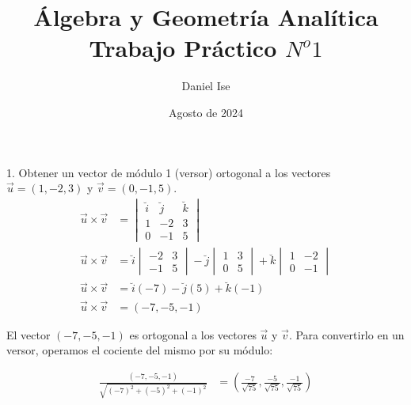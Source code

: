 \documentclass{article}
\title{Álgebra y Geometría Analítica\\ Trabajo Práctico $N^o1$}
\author{Daniel Ise}
\date{Agosto de 2024}
\begin{document}
\maketitle

1. Obtener un vector de módulo 1 (versor) ortogonal a los vectores
$\vec{u} = (1, -2, 3)$ y $\vec{v} = (0, -1, 5)$.
\begin{align*}
    \vec{u}\times\vec{v} & = \begin{vmatrix}
                                 \breve{i} & \breve{j} & \breve{k} \\
                                 1         & -2        & 3         \\
                                 0         & -1        & 5
                             \end{vmatrix}                                         \\
    \vec{u}\times\vec{v} & = \breve{i}\begin{vmatrix}
                                          -2 & 3 \\
                                          -1 & 5
                                      \end{vmatrix} - \breve{j}\begin{vmatrix}
                                                                   1 & 3 \\
                                                                   0 & 5
                                                               \end{vmatrix} + \breve{k}\begin{vmatrix}
                                                                                            1 & -2 \\
                                                                                            0 & -1
                                                                                        \end{vmatrix} \\
    \vec{u}\times\vec{v} & = \breve{i}(-7) - \breve{j}(5) + \breve{k}(-1)                              \\
    \vec{u}\times\vec{v} & = (-7, -5, -1)
\end{align*}

El vector $(-7, -5, -1)$ es ortogonal a los vectores $\vec{u}$ y $\vec{v}$. Para
convertirlo en un versor, operamos el cociente del mismo por su módulo:

\begin{align*}
    \frac{(-7, -5, -1)}{\sqrt{(-7)^2 + (-5)^2 + (-1)^2}} & =
    \boxed{\left(\frac{-7}{\sqrt{75}},\frac{-5}{\sqrt{75}},\frac{-1}{\sqrt{75}}\right)}
\end{align*}
\end{document}

